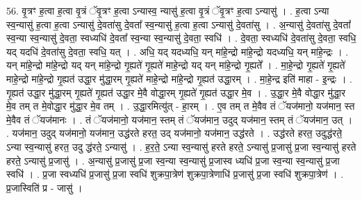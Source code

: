 \documentclass[17pt]{extarticle}
\begin{document}
56. वृ॒त्रꣳ ह॒त्वा ह॒त्वा वृ॒त्रं ॅवृ॒त्रꣳ ह॒त्वा ऽन्यास्व॒ न्यासु॑ ह॒त्वा वृ॒त्रं ॅवृ॒त्रꣳ ह॒त्वा ऽन्यासु॑ । . ह॒त्वा ऽन्या स्व॒न्यासु॑ ह॒त्वा ह॒त्वा ऽन्यासु॑ दे॒वता॑सु दे॒वता᳚ स्व॒न्यासु॑ ह॒त्वा ह॒त्वा ऽन्यासु॑ दे॒वता॑सु । . अ॒न्यासु॑ दे॒वता॑सु दे॒वता᳚ स्व॒न्या स्व॒न्यासु॑ दे॒वता॒ स्वध्यधि॑ दे॒वता᳚ स्व॒न्या स्व॒न्यासु॑ दे॒वता॒ स्वधि॑ । . दे॒वता॒ स्वध्यधि॑ दे॒वता॑सु दे॒वता॒ स्वधि॒ यद् यदधि॑ दे॒वता॑सु दे॒वता॒ स्वधि॒ यत् । . अधि॒ यद् यदध्यधि॒ यन् मा॑हे॒न्द्रो मा॑हे॒न्द्रो यदध्यधि॒ यन् मा॑हे॒न्द्रः । . यन् मा॑हे॒न्द्रो मा॑हे॒न्द्रो यद् यन् मा॑हे॒न्द्रो गृ॒ह्यते॑ गृ॒ह्यते॑ माहे॒न्द्रो यद् यन् मा॑हे॒न्द्रो गृ॒ह्यते᳚ । . मा॒हे॒न्द्रो गृ॒ह्यते॑ गृ॒ह्यते॑ माहे॒न्द्रो मा॑हे॒न्द्रो गृ॒ह्यत॑ उद्धा॒र मु॑द्धा॒रम् गृ॒ह्यते॑ माहे॒न्द्रो मा॑हे॒न्द्रो गृ॒ह्यत॑ उद्धा॒रम् । . मा॒हे॒न्द्र इति॑ माहा - इ॒न्द्रः । . गृ॒ह्यत॑ उद्धा॒र मु॑द्धा॒रम् गृ॒ह्यते॑ गृ॒ह्यत॑ उद्धा॒र मे॒वै वोद्धा॒रम् गृ॒ह्यते॑ गृ॒ह्यत॑ उद्धा॒र मे॒व । . उ॒द्धा॒र मे॒वै वोद्धा॒र मु॑द्धा॒र मे॒व तम् त मे॒वोद्धा॒र मु॑द्धा॒र मे॒व तम् । . उ॒द्धा॒रमित्यु॑त् - हा॒रम् । . ए॒व तम् त मे॒वैव तं ॅयज॑मानो॒ यज॑मान॒ स्त मे॒वैव तं ॅयज॑मानः । . तं ॅयज॑मानो॒ यज॑मान॒ स्तम् तं ॅयज॑मान॒ उदुद् यज॑मान॒ स्तम् तं ॅयज॑मान॒ उत् । . यज॑मान॒ उदुद् यज॑मानो॒ यज॑मान॒ उद्ध॑रते हरत॒ उद् यज॑मानो॒ यज॑मान॒ उद्ध॑रते । . उद्ध॑रते हरत॒ उदुद्ध॑रते॒ ऽन्या स्व॒न्यासु॑ हरत॒ उदु द्ध॑रते॒ ऽन्यासु॑ । . ह॒र॒ते॒ ऽन्या स्व॒न्यासु॑ हरते हरते॒ ऽन्यासु॑ प्र॒जासु॑ प्र॒जा स्व॒न्यासु॑ हरते हरते॒ ऽन्यासु॑ प्र॒जासु॑ । . अ॒न्यासु॑ प्र॒जासु॑ प्र॒जा स्व॒न्या स्व॒न्यासु॑ प्र॒जास्व ध्यधि॑ प्र॒जा स्व॒न्या स्व॒न्यासु॑ प्र॒जा स्वधि॑ । . प्र॒जा स्वध्यधि॑ प्र॒जासु॑ प्र॒जा स्वधि॑ शुक्रपा॒त्रेण॑ शुक्रपा॒त्रेणाधि॑ प्र॒जासु॑ प्र॒जा स्वधि॑ शुक्रपा॒त्रेण॑ । . प्र॒जास्विति॑ प्र - जासु॑ । \newline
\end{document}
